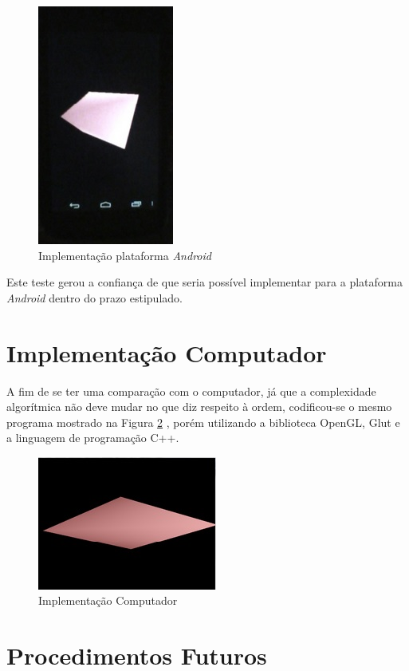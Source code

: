 	\begin{figure}[h]
	\centering
		\includegraphics[keepaspectratio=true,scale=1.0]{figuras/android.jpg}
	\caption{Implementação plataforma \textit{Android}}
	\label{android}
	\end{figure}

	Este teste gerou a confiança de que seria possível implementar para a plataforma \textit{Android} dentro do prazo estipulado.  

\section{Implementação Computador}

	A fim de se ter uma comparação com o computador, já que a complexidade algorítmica não deve mudar no que diz respeito à ordem, codificou-se o mesmo programa mostrado na Figura \ref{computador} , porém utilizando a biblioteca OpenGL, Glut e a linguagem de programação C++.

	\begin{figure}[h]
	\centering
		\includegraphics[keepaspectratio=true,scale=1.0]{figuras/computador.jpg}
	\caption{Implementação Computador}
	\label{computador}
	\end{figure}

\section{Procedimentos Futuros}


